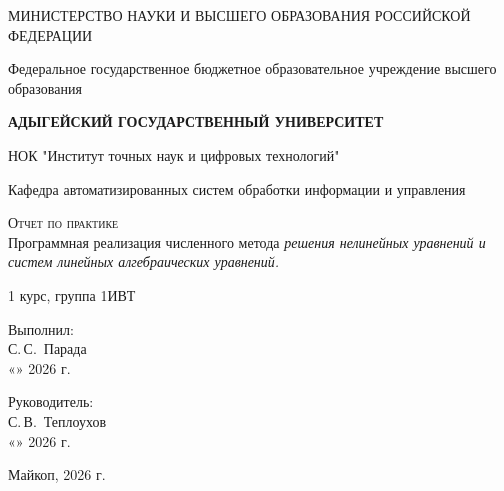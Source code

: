 \documentclass[12pt,a4paper]{scrartcl}
\begin{document}
	\begin{titlepage}
		\begin{center}
			\large
			МИНИСТЕРСТВО НАУКИ И ВЫСШЕГО ОБРАЗОВАНИЯ РОССИЙСКОЙ ФЕДЕРАЦИИ
			
			Федеральное государственное бюджетное образовательное учреждение высшего образования
			
			\textbf{АДЫГЕЙСКИЙ ГОСУДАРСТВЕННЫЙ УНИВЕРСИТЕТ}
			\vspace{0.25cm}
			
			НОК "Институт точных наук и цифровых технологий"
			
			Кафедра автоматизированных систем обработки информации и управления
			\vfill

			\vfill
			
			\textsc{Отчет по практике}\\[5mm]
			
			{\LARGE Программная реализация численного метода \textit{решения нелинейных уравнений и систем линейных алгебраических уравнений.}}
			\bigskip
			
			1 курс, группа 1ИВТ
		\end{center}
		\vfill
		
		\newlength{\ML}
		\hfill\begin{minipage}{0.5\textwidth}
			Выполнил:\\
			\underline{\hspace{\ML}} С.\,С.~Парада\\
			«\underline{\hspace{0.7cm}}» \underline{\hspace{2cm}} 2026 г.
		\end{minipage}%
		\bigskip
		
		\hfill\begin{minipage}{0.5\textwidth}
			Руководитель:\\
			\underline{\hspace{\ML}} С.\,В.~Теплоухов\\
			«\underline{\hspace{0.7cm}}» \underline{\hspace{2cm}} 2026 г.
		\end{minipage}%
		\vfill
		
		\begin{center}
			Майкоп, 2026 г.
		\end{center}
	\end{titlepage}
 
\end{document}
